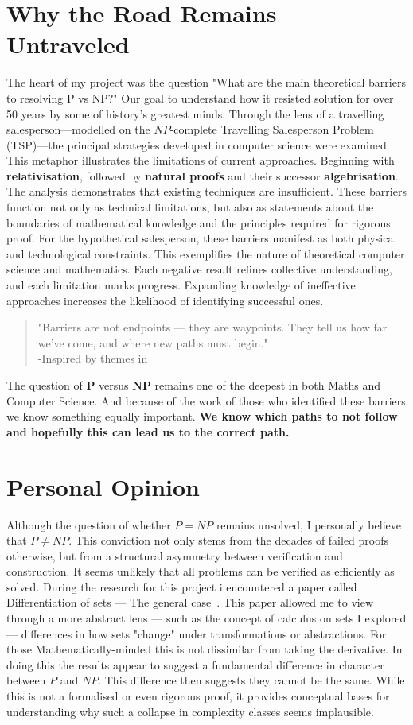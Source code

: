 \documentclass[12pt]{report}
\begin{document}
\section{Why the Road Remains Untraveled}
The heart of my project was the question "What are the main theoretical barriers to resolving P vs NP?"
Our goal to understand how it resisted solution for over 50 years by some of history's greatest minds.
Through the lens of a travelling salesperson—modelled on the $NP$-complete Travelling Salesperson Problem (TSP)—the principal strategies developed in computer science were examined.
This metaphor illustrates the limitations of current approaches.
Beginning with \textbf{relativisation}, followed by \textbf{natural proofs} and their successor \textbf{algebrisation}.
The analysis demonstrates that existing techniques are insufficient.
These barriers function not only as technical limitations, but also as statements about the boundaries of mathematical knowledge and the principles required for rigorous proof.
For the hypothetical salesperson, these barriers manifest as both physical and technological constraints.
This exemplifies the nature of theoretical computer science and mathematics.
Each negative result refines collective understanding, and each limitation marks progress.
Expanding knowledge of ineffective approaches increases the likelihood of identifying successful ones.
\begin{quote}
    "Barriers are not endpoints --- they are waypoints. They tell us how far we've come, and where new paths must begin."\\
    -Inspired by themes in~\cite{arora2009}
\end{quote}
The question of $\mathbf{P}$ versus $\mathbf{NP}$ remains one of the deepest in both Maths and Computer Science.
And because of the work of those who identified these barriers we know something equally important.
\textbf{We know which paths to not follow and hopefully this can lead us to the correct path.}

\section{Personal Opinion}
Although the question of whether $P = NP$ remains unsolved, I personally believe that $P \ne NP$.
This conviction not only stems from the decades of failed proofs otherwise, but from a structural asymmetry between verification and construction.
It seems unlikely that all problems can be verified as efficiently as solved.
During the research for this project i encountered a paper called Differentiation of sets --- The general case~\cite{WeilDifferentiate}.
This paper allowed me to view through a more abstract lens --- such as the concept of calculus on sets I explored --- differences in how sets "change" under transformations or abstractions.
For those Mathematically-minded this is not dissimilar from taking the derivative.
In doing this the results appear to suggest a fundamental difference in character between $P$ and $NP$.
This difference then suggests they cannot be the same.
While this is not a formalised or even rigorous proof, it provides conceptual bases for understanding why such a collapse in complexity classes seems implausible.
\end{document}
